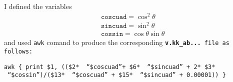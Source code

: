 \documentclass[landscape]{article}
\begin{document}
\newpage
I defined the variables
\begin{align*}
&\texttt{coscuad} = \cos^{2}\theta \\
&\texttt{sincuad} = \sin^{2} \theta\\
&\texttt{cossin}  = \cos\theta \sin\theta 
\end{align*}
and used {\tt awk} comand to produce the corresponding \tt{\textbf{v.kk\_ab...}}
file as follows:

\noindent
{\tt awk \textquotesingle\{ print \$1, ((\$2*\textquotesingle
\,``\$coscuad''\textquotesingle + \$6* \textquotesingle\,``\$sincuad''
\textquotesingle + 2* \$3* \textquotesingle\,``\$cossin''\textquotesingle)/(\$13*
\textquotesingle\,``\$coscuad'' \textquotesingle + \$15* \textquotesingle
\,``\$sincuad'' \textquotesingle + 0.00001)) \}\textquotesingle }
\end{document}
